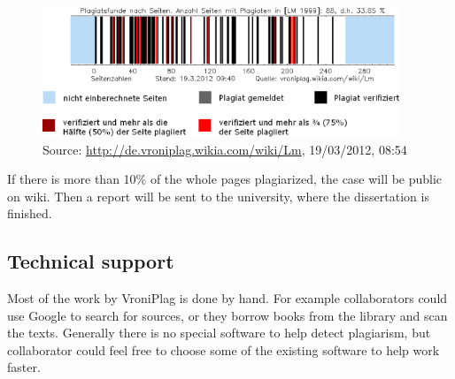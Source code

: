 \begin{figure}[!h]
  \centering
    \includegraphics[width=0.95\textwidth]{images/vroni-barcode.png}
  \caption{Source: \url{http://de.vroniplag.wikia.com/wiki/Lm}, 19/03/2012, 08:54}
  \label{fig:vroniBarcode}
\end{figure}



If there is more than 10\% of the whole pages plagiarized, the case will be public on wiki. Then a report will be sent 
to the university, where the dissertation is finished.

\subsection{Technical support}

Most of the work by VroniPlag is done by hand. For example collaborators could use Google to search for sources, 
or they borrow books from the library and scan the texts. Generally there is no special software to help detect 
plagiarism, but collaborator could feel free to choose some of the existing software to help work faster.

